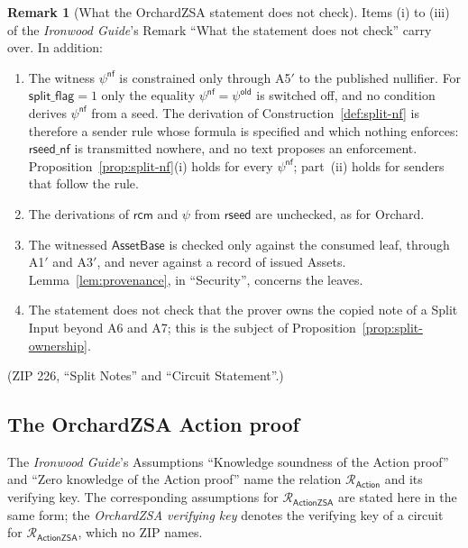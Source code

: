 \documentclass[11pt,a4paper]{article}
\theoremstyle{definition}
\newtheorem{remark}[theorem]{Remark}
\newcommand{\Rel}{\mathcal{R}}
\newcommand{\rcm}{\ensuremath{\mathsf{rcm}}}
\begin{document}
\begin{remark}[What the OrchardZSA statement does not check]
\label{rem:zsa-unchecked}
Items (i) to (iii) of the \emph{Ironwood Guide}'s Remark ``What the
statement does not check'' carry over. In addition:
\begin{enumerate}
\item[(iv)] The witness $\psi^{\mathsf{nf}}$ is constrained only through
  A5$'$ to the published nullifier. For $\mathsf{split\_flag} = 1$ only the
  equality $\psi^{\mathsf{nf}} = \psi^{\mathsf{old}}$ is switched off, and
  no condition derives $\psi^{\mathsf{nf}}$ from a seed. The derivation of
  Construction~\ref{def:split-nf} is therefore a sender rule whose formula
  is specified and which nothing enforces: $\mathsf{rseed\_nf}$ is
  transmitted nowhere, and no text proposes an enforcement.
  Proposition~\ref{prop:split-nf}(i) holds for every
  $\psi^{\mathsf{nf}}$; part~(ii) holds for senders that follow the rule.
\item[(v)] The derivations of $\rcm$ and $\psi$ from $\mathsf{rseed}$ are
  unchecked, as for Orchard.
\item[(vi)] The witnessed $\mathsf{AssetBase}$ is checked only against the
  consumed leaf, through A1$'$ and A3$'$, and never against a record of
  issued Assets. Lemma~\ref{lem:provenance}, in ``Security'', concerns the
  leaves.
\item[(vii)] The statement does not check that the prover owns the copied
  note of a Split Input beyond A6 and A7; this is the subject of
  Proposition~\ref{prop:split-ownership}.
\end{enumerate}
(ZIP 226, ``Split Notes'' and ``Circuit Statement''.)
\end{remark}

\FloatBarrier
\subsection{The OrchardZSA Action proof}\label{sec:action-proof}

The \emph{Ironwood Guide}'s Assumptions ``Knowledge soundness of the Action
proof'' and ``Zero knowledge of the Action proof'' name the relation
$\Rel_{\mathsf{Action}}$ and its verifying key. The corresponding
assumptions for $\Rel_{\mathsf{ActionZSA}}$ are stated here in the same
form; the \emph{OrchardZSA verifying key} denotes the verifying key of a
circuit for $\Rel_{\mathsf{ActionZSA}}$, which no ZIP names.
\end{document}
